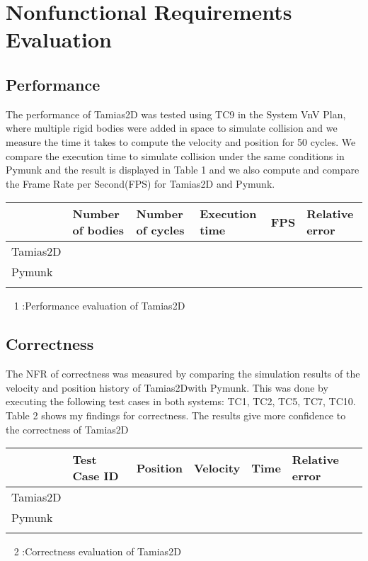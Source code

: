 \documentclass[12pt, titlepage]{article}
\newcommand{\progname}{Tamias2D}
\begin{document}
\section{Nonfunctional Requirements Evaluation}

\subsection{Performance}
The performance of \progname{} was tested using TC9 in the System VnV Plan, where multiple rigid bodies were added in space to simulate collision and we measure the time it takes to compute the velocity and position for 50 cycles. We compare the execution time to simulate collision under the same conditions in Pymunk and the result is displayed in Table 1 and we also compute and compare the Frame Rate per Second(FPS) for Tamias2D and Pymunk. 


\begin{table}[]
	\begin{tabular}{|l|l|l|l|l|l|}
		\hline
	& Number of bodies & Number of cycles  & Execution time & FPS & Relative error  \\ \hline
	Tamias2D	&  &  &  &  &  \\ \hline
	Pymunk	&  &  &  &  &  \\ \hline
		&  &  &  &  &  \\ \hline
		
	\end{tabular}
~\newline
\tablename{ 1 :Performance evaluation of Tamias2D}	
\end{table}
	
\subsection{Correctness}
The NFR of correctness was measured by comparing the simulation results of the velocity and position history of \progname with Pymunk. This was done by executing the following test cases in both systems: TC1, TC2, TC5, TC7, TC10. Table 2 shows my findings for correctness. The results give more confidence to the correctness of \progname

\begin{table}[]
	\begin{tabular}{|l|l|l|l|l|l|}
		\hline
		& Test Case ID & Position  & Velocity & Time & Relative error  \\ \hline
		Tamias2D	&  &  &  &  &  \\ \hline
		Pymunk	&  &  &  &  &  \\ \hline
		&  &  &  &  &  \\ \hline
		
	\end{tabular}
~\newline
\tablename{ 2 :Correctness evaluation of Tamias2D}
\end{table}
\end{document}
